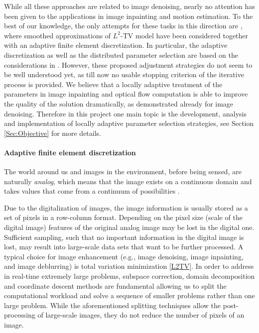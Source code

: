 \documentclass[enabledeprecatedfontcommands,cleardoublepage=empty,headsepline,twoside,11pt,DIV=15,BCOR=12mm,final]{scrartcl}
\begin{document}
While all these approaches are related to image denoising, nearly no attention has been given to the applications in image inpainting and motion estimation. To the best of our knowledge, the only attempts for these tasks in this direction are \cite{BelHec2016,TheBelKalMoa,BelKalMoaThe}, where smoothed approximations of $L^2$-TV model have been considered together with an adaptive finite element discretization. In particular, the adaptive discretization as well as the distributed parameter selection are based on the considerations in \cite{BouCha}. However, these proposed adjustment strategies do not seem to be well understood yet, as till now no usable stopping criterion of the iterative process is provided. We believe that a locally adaptive treatment of the parameters in image inpainting and optical flow computation is able to improve the quality of the solution dramatically, as demonstrated already for image denoising. Therefore in this project one main topic is the development, analysis and implementation of locally adaptive parameter selection strategies, see Section \ref{Sec:Objective} for more details. %


\paragraph{Adaptive finite element discretization}
The world around us and images in the environment, before being sensed, are naturally \emph{analog}, which means that the image exists on a continuous domain and takes values that come from a continuum of possibilities \cite{Bov}.

Due to the digitalization of images, the image information is usually stored as a set of pixels in a row-column format. Depending on the pixel size (scale of the digital image) features of the original analog image may be lost in the digital one. Sufficient sampling, such that no important information in the digital image is lost, may result into large-scale data sets that want to be further processed. A typical choice for image enhancement (e.g., image denoising, image inpainting, and image deblurring) is total variation minimization \eqref{L2TV}. In order to address in real-time extremely large problems, subspace correction, domain decomposition and coordinate descent methods are fundamental allowing us to split the computational workload and solve a sequence of smaller problems rather than one large problem. %
While the aforementioned splitting techniques allow the post-processing of large-scale images, they do not reduce the number of pixels of an image.
\end{document}
